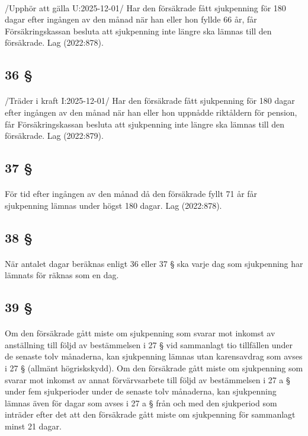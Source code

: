 \documentclass[a4paper,notitlepage,openany,10pt]{book}
\begin{document}
\paragraph*{}
/Upphör att gälla U:2025-12-01/
Har den försäkrade fått sjukpenning för 180 dagar efter ingången av den månad när han eller hon fyllde 66 år, får Försäkringskassan besluta att sjukpenning inte längre ska lämnas till den försäkrade.
Lag (2022:878).
\subsection*{36 §}
\paragraph*{}
/Träder i kraft I:2025-12-01/
Har den försäkrade fått sjukpenning för 180 dagar efter ingången av den månad när han eller hon uppnådde riktåldern för pension, får Försäkringskassan besluta att sjukpenning inte längre ska lämnas till den försäkrade.
Lag (2022:879).
\subsection*{37 §}
\paragraph*{}
För tid efter ingången av den månad då den försäkrade fyllt 71 år får sjukpenning lämnas under högst 180 dagar.
Lag (2022:878).
\subsection*{38 §}
\paragraph*{}
När antalet dagar beräknas enligt 36 eller 37 § ska varje dag som sjukpenning har lämnats för räknas som en dag.
\subsection*{39 §}
\paragraph*{}
Om den försäkrade gått miste om sjukpenning som svarar mot inkomst av anställning till följd av bestämmelsen i 27 § vid sammanlagt tio tillfällen under de senaste tolv månaderna, kan sjukpenning lämnas utan karensavdrag som avses i 27 § (allmänt högriskskydd). Om den försäkrade gått miste om sjukpenning som svarar mot inkomst av annat förvärvsarbete till följd av bestämmelsen i 27 a § under fem sjukperioder under de senaste tolv månaderna, kan sjukpenning lämnas även för dagar som avses i 27 a § från och med den sjukperiod som inträder efter det att den försäkrade gått miste om sjukpenning för sammanlagt minst 21 dagar.
\end{document}

